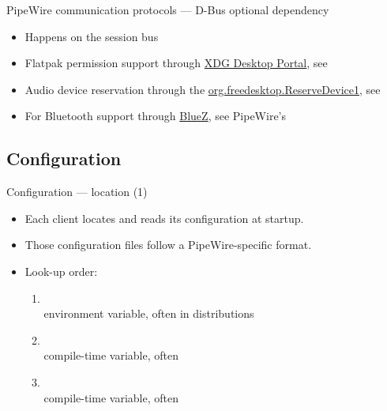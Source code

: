 \begin{frame}{PipeWire communication protocols — D-Bus optional dependency}
  \begin{itemize}

  \item Happens on the session bus
  \item Flatpak permission support through
    \href{https://docs.flatpak.org/en/latest/desktop-integration.html\#portals}{
    XDG Desktop Portal}, see 
  \item Audio device reservation through the
    \href{https://git.0pointer.net/reserve.git/tree/reserve.txt}{
    org.freedesktop.ReserveDevice1}, see
  \item For Bluetooth support through
    \href{http://www.bluez.org/}{BlueZ}, see PipeWire's

  \end{itemize}
\end{frame}



\subsection{Configuration}



\begin{frame}{Configuration — location (1)}
  \begin{itemize}

  \item Each client locates and reads its configuration at startup.

  \item Those configuration files follow a PipeWire-specific format.

  \item Look-up order:
    \begin{enumerate}
    \item {}\\
      environment variable, often  in distributions
    \item {}\\
      compile-time variable, often 
    \item {}\\
      compile-time variable, often 
    \end{enumerate}

  \end{itemize}
\end{frame}



